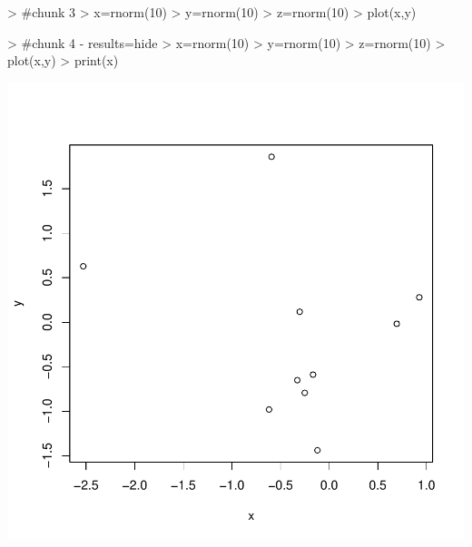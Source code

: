 \documentclass{article}
\begin{document}
\begin{Schunk}
\begin{Sinput}
> #chunk 3
> x=rnorm(10)
> y=rnorm(10)
> z=rnorm(10)
> plot(x,y)
\end{Sinput}
\end{Schunk}

\begin{Schunk}
\begin{Sinput}
> #chunk 4 - results=hide
> x=rnorm(10)
> y=rnorm(10)
> z=rnorm(10)
> plot(x,y)
> print(x)
\end{Sinput}
\end{Schunk}
\includegraphics{Demo_Cory-chunk_name4}
\end{document}
